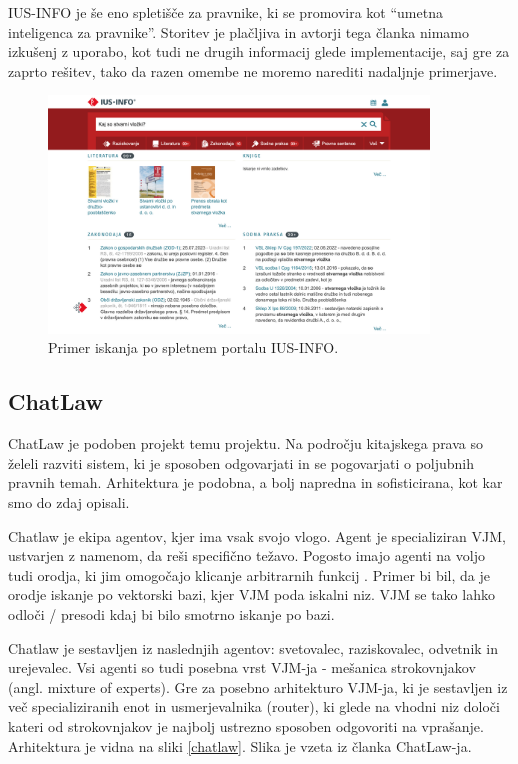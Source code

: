 \documentclass[a4paper,12pt,openright]{book}
\begin{document}
IUS-INFO \cite{ius-info} je še eno spletišče za pravnike, ki se promovira kot “umetna inteligenca za pravnike”. Storitev je plačljiva in avtorji tega članka nimamo izkušenj z uporabo, kot tudi ne drugih informacij glede implementacije, saj gre za zaprto rešitev, tako da razen omembe ne moremo narediti nadaljnje primerjave.

\begin{figure}[htbp]
    \centering
    \includegraphics[width=0.9\textwidth]{ius-info.png}
    \caption{Primer iskanja po spletnem portalu IUS-INFO.}
    \label{ius_info}
\end{figure}

\clearpage

\subsection{ChatLaw}

ChatLaw \cite{chatlaw} je podoben projekt temu projektu. Na področju kitajskega prava so želeli razviti sistem, ki je sposoben odgovarjati in se pogovarjati o poljubnih pravnih temah. Arhitektura je podobna, a bolj napredna in sofisticirana, kot kar smo do zdaj opisali.

Chatlaw je ekipa agentov, kjer ima vsak svojo vlogo. Agent je specializiran VJM, ustvarjen z namenom, da reši specifično težavo. Pogosto imajo agenti na voljo tudi orodja, ki jim omogočajo klicanje arbitrarnih funkcij \cite{agents}. Primer bi bil, da je orodje iskanje po vektorski bazi, kjer VJM poda iskalni niz. VJM se tako lahko odloči / presodi kdaj bi bilo smotrno iskanje po bazi.

Chatlaw je sestavljen iz naslednjih agentov: svetovalec, raziskovalec, odvetnik in urejevalec. Vsi agenti so tudi posebna vrst VJM-ja - mešanica strokovnjakov (angl. mixture of experts). Gre za posebno arhitekturo VJM-ja, ki je sestavljen iz več specializiranih enot in usmerjevalnika (router), ki glede na vhodni niz določi kateri od strokovnjakov je najbolj ustrezno sposoben odgovoriti na vprašanje. Arhitektura je vidna na sliki \ref{chatlaw}. Slika je vzeta iz članka ChatLaw-ja.
\end{document}
